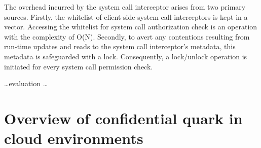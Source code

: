 The overhead incurred by the system call interceptor arises from two primary sources. Firstly, the whitelist of client-side system call interceptors is kept in a vector. Accessing the whitelist for system call authorization check is an operation with the complexity of O(N). Secondly, to avert any contentions resulting from run-time updates and reads to the system call interceptor's metadata, this metadata is safeguarded with a lock. Consequently, a lock/unlock operation is initiated for every system call permission check.

\ldots evaluation \ldots



\section{Overview of confidential quark in cloud environments}

\cleardoublepage

